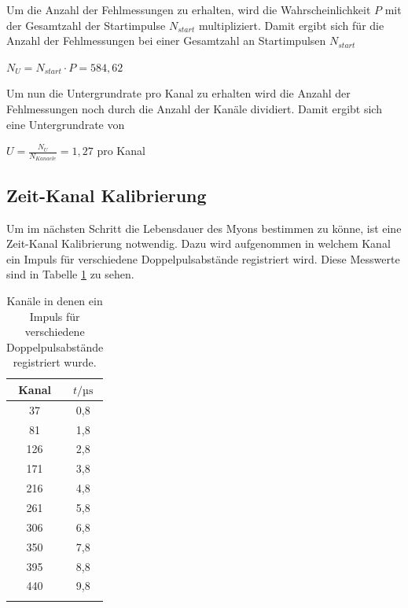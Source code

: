 \noindent Um die Anzahl der Fehlmessungen zu erhalten, wird die Wahrscheinlichkeit $P$ mit der Gesamtzahl der Startimpulse $N_{start}$ multipliziert. Damit ergibt sich für die Anzahl der Fehlmessungen bei einer Gesamtzahl an Startimpulsen $N_{start}$

\begin{center}
$N_{U}=N_{start}\cdot P= 584,62$
\end{center}

\noindent Um nun die Untergrundrate pro Kanal zu erhalten wird die Anzahl der Fehlmessungen noch durch die Anzahl der Kanäle dividiert. Damit ergibt sich eine Untergrundrate von 

\begin{center}
$U=\frac{N_U}{N_{Kanaele}}=1,27$ pro Kanal
\end{center}

\subsection{Zeit-Kanal Kalibrierung}
\label{subsec:3}

\noindent Um im nächsten Schritt die Lebensdauer des Myons bestimmen zu könne, ist eine Zeit-Kanal Kalibrierung notwendig. Dazu wird aufgenommen in welchem Kanal ein Impuls für verschiedene Doppelpulsabstände registriert wird. Diese Messwerte sind in Tabelle \ref{tab:table2} zu sehen.

\begin{table}[H]
\centering
\caption{Kanäle in denen ein Impuls für verschiedene Doppelpulsabstände registriert wurde.}
\begin{tabular}{c|c}
Kanal & $t/\mathrm{µs}$ \\
\hline
37		&0,8 \\
81		&1,8 \\ 
126		&2,8 \\
171		&3,8 \\
216		&4,8 \\
261		&5,8 \\
306		&6,8 \\
350		&7,8 \\
395		&8,8 \\
440		&9,8 \\
\label{tab:table2}
\end{tabular}
\end{table}

